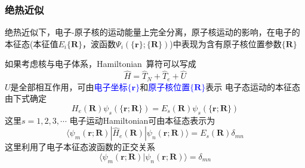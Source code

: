 %
\frame
{
	\frametitle{绝热近似}
	绝热近似下，电子-原子核的运动能量上完全分离，原子核运动的影响，在电子的本征态(本征值$E_i\{\mathbf{R}\}$，波函数$\Psi_i(\{\mathbf{r}\};\{\mathbf{R}\})$)中表现为含有原子核位置参数$\{\mathbf{R}\}$

	如果考虑核与电子体系，\textrm{Hamiltonian~}算符可以写成
	\begin{displaymath}
		\hat H=\hat T_N+\hat T_e+\hat U
	\end{displaymath}
	$U$是全部相互作用，可由\textcolor{blue}{电子坐标$\{\mathbf{r}\}$}和\textcolor{blue}{原子核位置$\{\mathbf{R}\}$}表示
\vskip 5pt
	电子态运动的本征态由下式确定
	\begin{displaymath}
		H_e(\mathbf{R})\psi_s(\{\mathbf{r};\mathbf{R}\})=E_s(\mathbf{R})\psi_s(\{\mathbf{r};\mathbf{R}\})
	\end{displaymath}
	这里$s=1,2,3,\cdots$
	电子运动\textrm{Hamiltonian}可由本征态表示为
	\begin{displaymath}
		\langle\psi_m(\mathbf{r};\mathbf{R})|\hat H_e(\mathbf{R})|\psi_n(\mathbf{r};\mathbf{R})\rangle=E_s(\mathbf{R})\delta_{mn}
	\end{displaymath}
	这里利用了电子本征态波函数的正交关系
	\begin{displaymath}
		\langle\psi_m(\mathbf{r};\mathbf{R})|\psi_n(\mathbf{r};\mathbf{R})\rangle=\delta_{mn}
	\end{displaymath}
}


